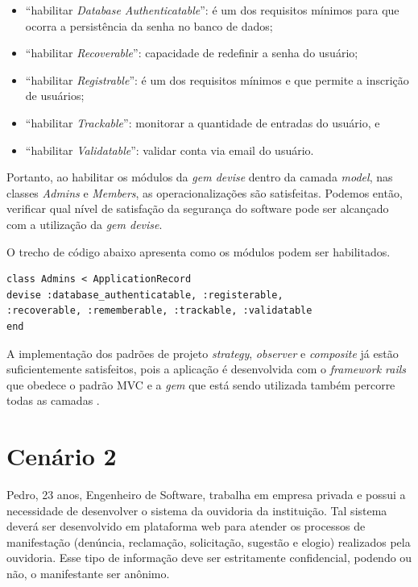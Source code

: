 \begin{itemize}
	\item “habilitar \textit{Database Authenticatable}”: é um dos requisitos mínimos para que ocorra a persistência da senha no banco de dados;
	\item “habilitar \textit{Recoverable}”: capacidade de redefinir a senha do usuário;
	\item “habilitar \textit{Registrable}”: é um dos requisitos mínimos e que permite a inscrição de usuários; 
	\item “habilitar \textit{Trackable}”: monitorar a quantidade de entradas do usuário, e 
	\item “habilitar \textit{Validatable}”: validar conta via email do usuário. 
\end{itemize}

Portanto, ao habilitar os módulos da \textit{gem devise} dentro da camada \textit{model}, nas classes \textit{Admins} e \textit{Members}, as operacionalizações são satisfeitas. Podemos então, verificar qual nível de satisfação da segurança do software pode ser alcançado com a utilização da \textit{gem devise}. 

O trecho de código abaixo apresenta como os módulos podem ser habilitados.  
 
\begin{lstlisting} 
class Admins < ApplicationRecord
devise :database_authenticatable, :registerable,
:recoverable, :rememberable, :trackable, :validatable
end 
\end{lstlisting} 

A implementação dos padrões de projeto \textit{strategy}, \textit{observer} e \textit{composite} já estão suficientemente satisfeitos, pois a aplicação é desenvolvida com o \textit{framework rails} que obedece o padrão MVC \cite{railscommunity} e a \textit{gem} que está sendo utilizada também percorre todas as camadas \cite{gemdevise}. 

\section{Cenário 2}
\label{subsec:persona2}

Pedro, 23 anos, Engenheiro de Software, trabalha em empresa privada e possui a necessidade de desenvolver o sistema da ouvidoria da instituição. Tal sistema deverá ser desenvolvido em plataforma web para atender os processos de manifestação (denúncia, reclamação, solicitação, sugestão e elogio) realizados pela ouvidoria. Esse tipo de informação deve ser estritamente confidencial, podendo ou não, o manifestante ser anônimo.  

